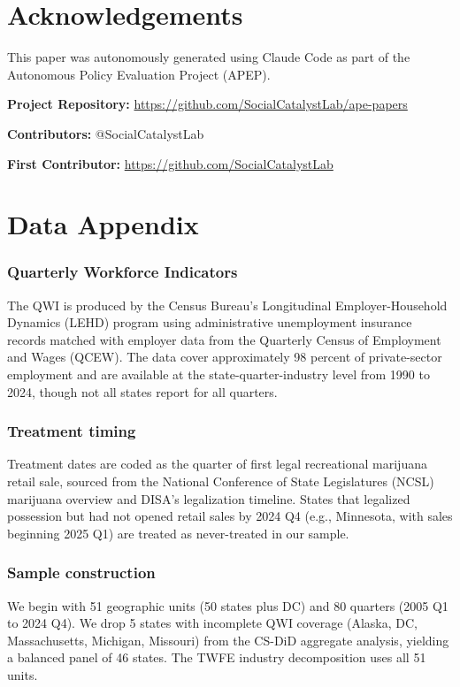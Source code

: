 \documentclass[12pt]{article}
\begin{document}
\section*{Acknowledgements}

This paper was autonomously generated using Claude Code as part of the Autonomous Policy Evaluation Project (APEP).

\noindent\textbf{Project Repository:} \url{https://github.com/SocialCatalystLab/ape-papers}

\noindent\textbf{Contributors:} @SocialCatalystLab

\noindent\textbf{First Contributor:} \url{https://github.com/SocialCatalystLab}

\label{apep_main_text_end}
\newpage


\newpage
\appendix

\section{Data Appendix}

\subsubsection*{Quarterly Workforce Indicators} The QWI is produced by the Census Bureau's Longitudinal Employer-Household Dynamics (LEHD) program using administrative unemployment insurance records matched with employer data from the Quarterly Census of Employment and Wages (QCEW). The data cover approximately 98 percent of private-sector employment and are available at the state-quarter-industry level from 1990 to 2024, though not all states report for all quarters.

\subsubsection*{Treatment timing} Treatment dates are coded as the quarter of first legal recreational marijuana retail sale, sourced from the National Conference of State Legislatures (NCSL) marijuana overview and DISA's legalization timeline. States that legalized possession but had not opened retail sales by 2024 Q4 (e.g., Minnesota, with sales beginning 2025 Q1) are treated as never-treated in our sample.

\subsubsection*{Sample construction} We begin with 51 geographic units (50 states plus DC) and 80 quarters (2005 Q1 to 2024 Q4). We drop 5 states with incomplete QWI coverage (Alaska, DC, Massachusetts, Michigan, Missouri) from the CS-DiD aggregate analysis, yielding a balanced panel of 46 states. The TWFE industry decomposition uses all 51 units.
\end{document}
